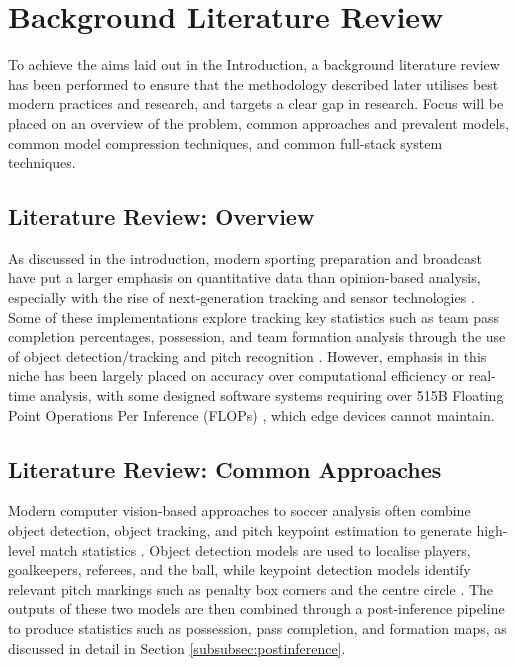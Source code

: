 \section{Background Literature Review}

To achieve the aims laid out in the Introduction, a background literature review has been performed to ensure that the methodology described later utilises best modern practices and research, and targets a clear gap in research. Focus will be placed on an overview of the problem, common approaches and prevalent models, common model compression techniques, and common full-stack system techniques. 

\subsection{Literature Review: Overview} As discussed in the introduction, modern sporting preparation and broadcast have put a larger emphasis on quantitative data than opinion-based analysis, especially with the rise of next-generation tracking and sensor technologies \cite{ReinMemmert2016}. Some of these implementations explore tracking key statistics such as team pass completion percentages, possession, and team formation analysis through the use of object detection/tracking and pitch recognition \cite{zheng2025_review_football_cv,Mooney2014CVSports}. However, emphasis in this niche has been largely placed on accuracy over computational efficiency or real-time analysis, with some designed software systems requiring over 515B Floating Point Operations Per Inference (FLOPs) \cite{roboflow_sports_repo}, which edge devices cannot maintain.

\subsection{Literature Review: Common Approaches}
Modern computer vision-based approaches to soccer analysis often combine object detection, object tracking, and pitch keypoint estimation to generate high-level match statistics \cite{tracking}. Object detection models are used to localise players, goalkeepers, referees, and the ball, while keypoint detection models identify relevant pitch markings such as penalty box corners and the centre circle \cite{IEEE2024PitchKeypoints}. The outputs of these two models are then combined through a post-inference pipeline to produce statistics such as possession, pass completion, and formation maps, as discussed in detail in Section \ref{subsubsec:postinference}.

